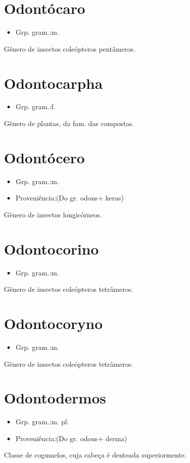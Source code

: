 \section{Odontócaro}
\begin{itemize}
\item {Grp. gram.:m.}
\end{itemize}
Gênero de insectos coleópteros pentâmeros.
\section{Odontocarpha}
\begin{itemize}
\item {Grp. gram.:f.}
\end{itemize}
Gênero de plantas, da fam. das compostas.
\section{Odontócero}
\begin{itemize}
\item {Grp. gram.:m.}
\end{itemize}
\begin{itemize}
\item {Proveniência:(Do gr. \textunderscore odous\textunderscore  + \textunderscore keras\textunderscore )}
\end{itemize}
Gênero de insectos longicórneos.
\section{Odontocorino}
\begin{itemize}
\item {Grp. gram.:m.}
\end{itemize}
Gênero de insectos coleópteros tetrâmeros.
\section{Odontocoryno}
\begin{itemize}
\item {Grp. gram.:m.}
\end{itemize}
Gênero de insectos coleópteros tetrâmeros.
\section{Odontodermos}
\begin{itemize}
\item {Grp. gram.:m. pl.}
\end{itemize}
\begin{itemize}
\item {Proveniência:(Do gr. \textunderscore odous\textunderscore  + \textunderscore derma\textunderscore )}
\end{itemize}
Classe de cogumelos, cuja cabeça é denteada superiormente.
